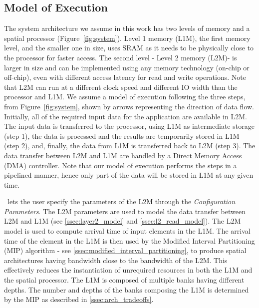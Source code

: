 \vspace{-1mm}
\subsection{Model of Execution}
\label{ssec:system_under_analysis}
\vspace{-1mm}
The system architecture we assume in this work has two levels of memory and a spatial processor (Figure~\ref{fig:system}). Level 1 memory (L1M)\footnotemark, the first memory level, and the smaller one in size, uses SRAM as it needs to be physically close to the processor for faster access. The second level - Level 2 memory (L2M)\footnotemark[\value{footnote}] - is larger in size and can be implemented using any memory technology (on-chip or off-chip), even with different access latency for read and write operations. Note that L2M can run at a different clock speed and different IO width than the processor and L1M.
We assume a model of execution following the three steps, from Figure~\ref{fig:system}, shown by arrows representing the direction of data flow. Initially, all of the required input data for the application are available in L2M. The input data is transferred to the processor, using L1M as intermediate storage (step 1), the data is processed and the results are temporarily stored in L1M (step 2), and, finally, the data from L1M is transferred back to L2M (step 3). The data transfer between L2M and L1M are handled by a Direct Memory Access (DMA) controller. Note that our model of execution performs the steps in a pipelined manner, hence only part of the data will be stored in L1M at any given time.

\frameworkname~lets the user specify the parameters of the L2M through the \textit{Configuration Parameters}. The L2M parameters are used to model the data transfer between L2M and L1M (see \ref{ssec:layer2_model} and \ref{ssec:l2_read_model}). The L2M model is used to compute arrival time of input elements in the L1M. The arrival time of the element in the L1M is then used by the Modified Interval Partitioning (MIP) algorithm  - see \ref{ssec:modified_interval_partitioning}, to produce spatial architectures having bandwidth close to the bandwidth of the L2M. This effectively reduces the instantiation of unrequired resources in both the L1M and the spatial processor.
The L1M is composed of multiple banks having different depths. The number and depths of the banks composing the L1M is determined by the MIP as described in \ref{ssec:arch_tradeoffs}.

